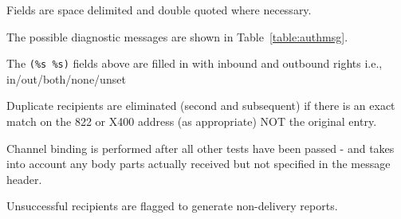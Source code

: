 Fields are space delimited and double quoted where necessary.

The possible diagnostic messages are shown in Table~\ref{table:authmsg}.


The \verb+(%s %s)+ fields above are filled in with inbound and outbound
rights i.e.,  in/out/both/none/unset

Duplicate recipients are eliminated (second and subsequent) if there
is an exact match on the 822 or X400 address (as appropriate) NOT the
original entry.

Channel binding is performed after all other tests have been passed - and
takes into account any body parts actually received but not specified in the
message header.

Unsuccessful recipients are flagged to generate non-delivery reports.
